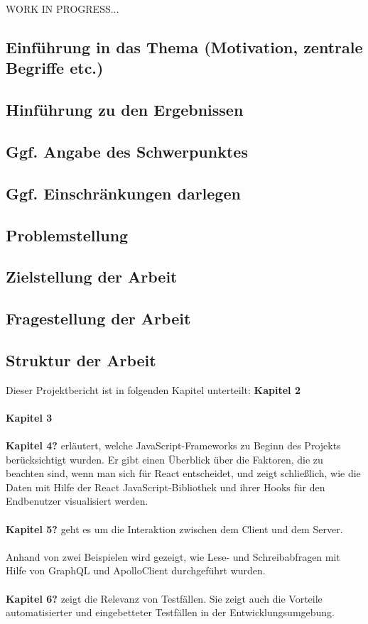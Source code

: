 WORK IN PROGRESS...

\subsection{Einführung in das Thema (Motivation, zentrale Begriffe etc.)}
\subsection{Hinführung zu den Ergebnissen}
\subsection{Ggf. Angabe des Schwerpunktes}
\subsection{Ggf. Einschränkungen darlegen}
\subsection{Problemstellung}
\subsection{Zielstellung der Arbeit}
\subsection{Fragestellung der Arbeit}

\subsection{Struktur der Arbeit}
Dieser Projektbericht ist in folgenden Kapitel unterteilt:
\textbf{Kapitel 2}
\\\\
\textbf{Kapitel 3}
\\\\
\textbf{Kapitel 4?} erläutert, welche JavaScript-Frameworks zu Beginn des Projekts berücksichtigt wurden. Er gibt einen Überblick über die Faktoren, die zu beachten sind, wenn man sich für React entscheidet, und zeigt schließlich, wie die Daten mit Hilfe der React JavaScript-Bibliothek und ihrer Hooks für den Endbenutzer visualisiert werden.
\\\\
\textbf{Kapitel 5?} geht es um die Interaktion zwischen dem Client und dem Server. 
\\\\
Anhand von zwei Beispielen wird gezeigt, wie Lese- und Schreibabfragen mit Hilfe von GraphQL und ApolloClient durchgeführt wurden.
\\\\
\textbf{Kapitel 6?} zeigt die Relevanz von Testfällen. Sie zeigt auch die Vorteile automatisierter und eingebetteter Testfällen in der Entwicklungsumgebung.
\\